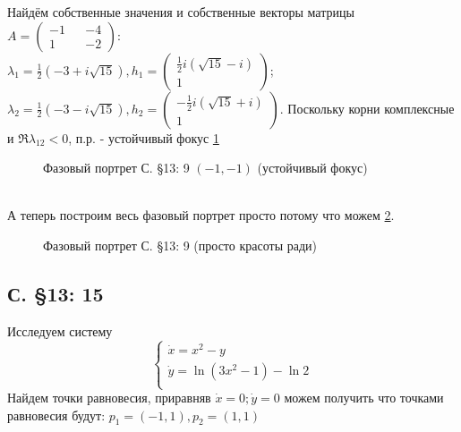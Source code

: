 \documentclass{article}
\begin{document}
Найдём собственные значения и собственные векторы матрицы $A=\begin{pmatrix} -1 && -4 \\ 1 && -2 \end{pmatrix}$:\\
 $\lambda_1=\frac{1}{2} \left(-3+i \sqrt{15}\right),
 h_1 = \begin{pmatrix} \frac{1}{2} i \left(\sqrt{15}-i\right) \\  1 \end{pmatrix} $; 
 $\lambda_2= \frac{1}{2}\left(-3-i \sqrt{15}\right),
 h_2 = \begin{pmatrix} -\frac{1}{2} i \left(\sqrt{15}+i\right)  \\  1 \end{pmatrix} $. 
 Поскольку корни комплексные и $\Re \lambda_{12}<0$, п.р. - устойчивый фокус \ref{13.9.2}
 \begin{figure}[ht]
\caption{Фазовый портрет С. \S13: 9 $(-1,-1)$ (устойчивый фокус)}
\label{13.9.2}
\end{figure}\\

А теперь построим весь фазовый портрет просто потому что можем \ref{13.9.3}.\\

\begin{figure}[ht]
\caption{Фазовый портрет С. \S13: 9  (просто красоты ради)}
\label{13.9.3}
\end{figure}

\subsection{С. \S13: 15}
Исследуем систему 
\begin{equation}
\begin{cases}
        \dot{x}=x^2-y\\
        \dot{y}=\ln{(3x^2-1)}-\ln{2}\\
    \end{cases}    
\end{equation}
Найдем точки равновесия, приравняв $\dot{x}=0; \dot{y}=0$ можем получить что точками равновесия будут: $p_1=(-1,1),p_2=(1,1)$\\
\end{document}
